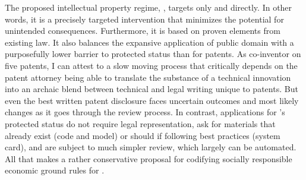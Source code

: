 The proposed intellectual property regime, , targets  only and
directly. In other words, it is a precisely targeted intervention that minimizes
the potential for unintended consequences. Furthermore, it is based on proven
elements from existing  law. It also balances the expansive application of
public domain with a purposefully lower barrier to protected status than for
patents. As co-inventor on five patents, I can attest to a slow moving process
that critically depends on the patent attorney being able to translate the
substance of a technical innovation into an archaic blend between technical and
legal writing unique to patents. But even the best written patent disclosure
faces uncertain outcomes and most likely changes as it goes through the review
process. In contrast, applications for 's protected status do not require
legal representation, ask for materials that already exist (code and model) or
should if following best practices (system card), and are subject to much
simpler review, which largely can be automated. All that makes  a rather
conservative proposal for codifying socially responsible economic ground rules
for .
